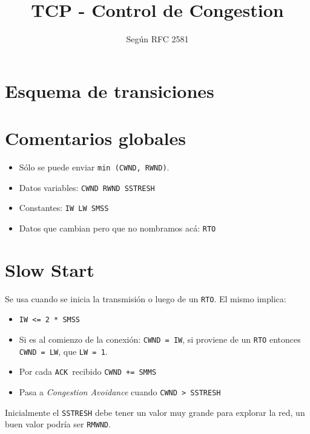 \documentclass[a4paper,10pt]{article}
\title{TCP - Control de Congestion}
\author{Según RFC 2581}
\date{}
\def\ack{\texttt{ACK}\ }
\newcommand\cmd[1]{\texttt{#1}}
\begin{document}
\maketitle

\section*{Esquema de transiciones}


\section*{Comentarios globales}
\begin{itemize}
	\item Sólo se puede enviar \texttt{min (CWND, RWND)}.
	\item Datos variables: \cmd{CWND RWND SSTRESH}
	\item Constantes: \cmd{IW LW SMSS}
	\item Datos que cambian pero que no nombramos acá: \cmd{RTO}
\end{itemize}


\section*{Slow Start}
Se usa cuando se inicia la transmisión o luego de un \cmd{RTO}. El mismo
implica:
\begin{itemize}
	\item \cmd{IW <= 2 * SMSS}
	\item Si es al comienzo de la conexión: \cmd{CWND = IW}, si proviene de un
		\cmd{RTO} entonces \cmd{CWND = LW}, que \cmd{LW = 1}.
	\item Por cada \ack recibido \cmd{CWND += SMMS}
	\item Pasa a \emph{Congestion Avoidance} cuando \cmd{CWND > SSTRESH}		
\end{itemize}
Inicialmente el \cmd{SSTRESH} debe tener un valor muy grande para explorar la
red, un buen valor podría ser \cmd{RMWND}.
\end{document}
